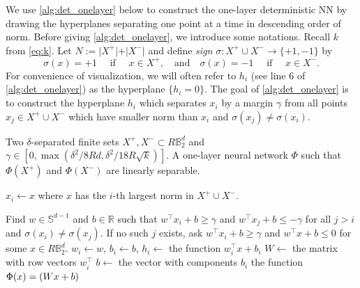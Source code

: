 \documentclass[aoap]{imsart}
\numberwithin{equation}{section}
\theoremstyle{definition}
\theoremstyle{remark}
\numberwithin{equation}{section}
\renewcommand{\S}{\mathbb{S}}
\newcommand{\0}{\mathbf{0}}
\newcommand{\1}{\mathbf{1}}
\newcommand{\B}{\mathbb{B}}
\renewcommand{\S}{\mathbb{S}}
\let \Re \relax
\DeclareMathOperator{\Re}{ReLU}
\numberwithin{equation}{section}
\begin{document}
We use \cref{alg:det_onelayer} below to construct the one-layer deterministic NN by drawing the hyperplanes separating one point at a time in descending order of norm. Before giving \cref{alg:det_onelayer}, we introduce some notations. Recall $k$ from \eqref{eq:k}. Let $N:=\vert X^{+}\vert +\vert X^{-}\vert$ and define \emph{sign} $\sigma: X^{+}\cup X^{-}\to \{+1,-1\}$ by 
\begin{equation}\label{eq:sigma}
\sigma(x)=+1 \quad\text{  if  }\quad  x\in X^{+}, \quad \text{and} \quad  \sigma(x)=-1 \quad \text{  if  }\quad  x\in X^{-}.  
\end{equation}
For convenience of visualization, we will often refer to $h_i$ (see line 6 of \cref{alg:det_onelayer}) as the hyperplane $\lbrace h_i=0\rbrace$. The goal of \cref{alg:det_onelayer} is to construct the hyperplane $h_i$ which separates $x_{i}$ by a margin $\gamma$ from all points $x_j\in X^{+}\cup X^{-}$ which have smaller norm than $x_i$ and $\sigma(x_j)\neq \sigma(x_i)$.
\begin{algorithm}[H]
\caption{Construct a one-layer NN separating two finite sets with a margin}
\label{alg:det_onelayer}
\begin{algorithmic}[1]
\Require Two $\delta$-separated finite sets $X^{+}, X^{-}\subset R\B_{2}^{d}$ and $\gamma \in [0, \max(\delta^2/8Rd, \delta^2/18R\sqrt{k})]$.
\Ensure A one-layer neural network $\Phi$ such that $\Phi(X^{+})$ and $\Phi(X^{-})$ are linearly separable.

\State $x_i \gets x$ where $x$ has the $i$-th largest norm in $X^+ \cup X^-$.
\EndFor
{}

    \State Find $w\in \S^{d-1}$ and $b\in \mathbb{R}$ such that $w^{\intercal}x_i +b\geq \gamma$ and $w^{\intercal}x_j+b\leq -\gamma$ for all $j > i$ and $\sigma(x_i) \neq \sigma(x_j)$. If no such $j$ exists, ask $w^{\intercal}x_i +b\geq \gamma$ and $w^{\intercal}x +b \leq 0$ for some $x\in R\B_2^d$.
    \State $w_i \gets w$, $b_i \gets b$, $h_i \gets$ the function $w^{\intercal}_ix + b_i$ %
\EndFor
\State $W \gets$ the matrix with row vectors $w_i^{\intercal}$
\State $b \gets$ the vector with components $b_i$
\State \Return the function $\Phi(x)=\Re(Wx + b)$
\end{algorithmic}
\end{algorithm}
\end{document}
